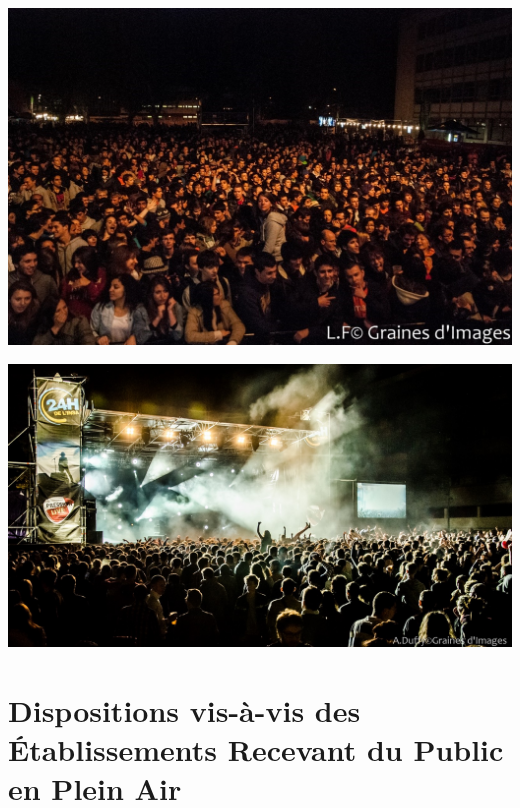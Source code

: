 \documentclass[hidelinks, paper=a4, fontsize=13pt]{report}
\begin{document}
\begin{center}
	\includegraphics[scale=0.8]{Annexes/Images/concert2}
\end{center}
\vspace{10mm}
\begin{center}
	\includegraphics[scale=10]{Annexes/Images/concert1}
\end{center}
\newpage

\section{Dispositions vis-à-vis des Établissements Recevant du Public en Plein Air}
\end{document}
